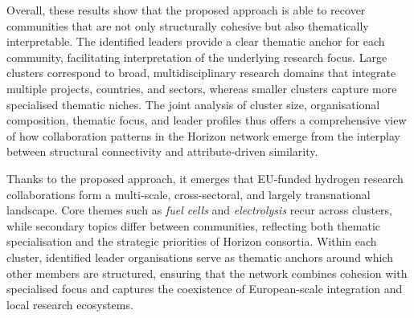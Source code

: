 \documentclass[11pt]{article}
\begin{document}
Overall, these results show that the proposed approach is able to recover communities that are not only structurally cohesive but also thematically interpretable. The identified leaders provide a clear thematic anchor for each community, facilitating interpretation of the underlying research focus. Large clusters correspond to broad, multidisciplinary research domains that integrate multiple projects, countries, and sectors, whereas smaller clusters capture more specialised thematic niches. The joint analysis of cluster size, organisational composition, thematic focus, and leader profiles thus offers a comprehensive view of how collaboration patterns in the Horizon network emerge from the interplay between structural connectivity and attribute-driven similarity.

Thanks to the proposed approach, it emerges that EU-funded hydrogen research collaborations form a multi-scale, cross-sectoral, and largely transnational landscape. Core themes such as \textit{fuel cells} and \textit{electrolysis} recur across clusters, while secondary topics differ between communities, reflecting both thematic specialisation and the strategic priorities of Horizon consortia. Within each cluster, identified leader organisations serve as thematic anchors around which other members are structured, ensuring that the network combines cohesion with specialised focus and captures the coexistence of European-scale integration and local research ecosystems.

\begin{table}[bt!]
\centering
\caption{Composition of the five largest clusters (including ties) by country and activity type}
\label{tab:cluster_country}
\end{table}
\end{document}

